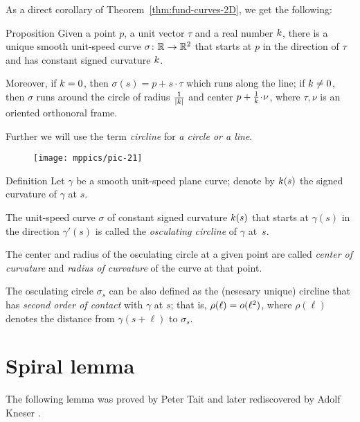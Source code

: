 As a direct corollary of Theorem~\ref{thm:fund-curves-2D}, we get the following:

\begin{thm}{Proposition}\label{prop:circline}
Given a point $p$,
a unit vector $\tau$ 
and a real number $k$, there is a unique smooth unit-speed curve $\sigma\colon\mathbb{R}\to\mathbb{R}^2$ 
that starts at $p$ in the direction of $\tau$ and has constant signed curvature $k$.

Moreover, if $k=0$, then $\sigma(s)=p+s\cdot \tau$ which runs along the line;
if $k\ne 0$, then $\sigma$ runs around the circle of radius $\tfrac1{|k|}$ and center $p+\tfrac1\skur\cdot \nu$, where $\tau,\nu$ is an oriented orthonoral frame.
\end{thm}

Further we will use the term \emph{circline} for \emph{a circle or a line}.

{

\begin{wrapfigure}{r}{30 mm}
\vskip-0mm
\centering
\texttt{[image: mppics/pic-21]}
\vskip0mm
\end{wrapfigure}

\begin{thm}{Definition}
Let $\gamma$ be a smooth unit-speed plane curve;
denote by $k(s)$ the signed curvature of $\gamma$ at $s$.

The unit-speed curve $\sigma$ of constant signed curvature $k(s)$ that starts at $\gamma(s)$ in the direction $\gamma'(s)$ is called the \emph{osculating circline} of $\gamma$ at~$s$.
\end{thm}

}

The center and radius of the osculating circle at a given point are called \emph{center of curvature} and \emph{radius of curvature} of the curve at that point.

The osculating circle $\sigma_s$ can be also defined as the (nesesary unique) circline that has \emph{second order of contact} with $\gamma$ at $s$;
that is, $\rho(\ell)\z=o(\ell^2)$, where $\rho(\ell)$ denotes the distance from $\gamma(s+\ell)$ to $\sigma_s$.

\section*{Spiral lemma}
\label{spiral}

The following lemma was proved by Peter Tait \cite{tait}
and later rediscovered by Adolf Kneser \cite{kneser}.


